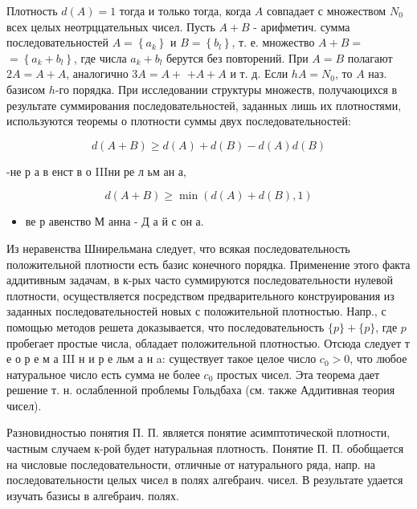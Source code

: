 \documentclass[10pt]{article}
\begin{document}
Плотность $d(A)=1$ тогда и только тогда, когда $A$ совпадает с множеством $N_{0}$ всех целых неотрццательных чисел. Пусть $A+B$ - арифметич. сумма последовательностей $A=\left\{a_{k}\right\}$ и $B=\left\{b_{l}\right\}$, т. е. множество $A+B=$ $=\left\{a_{k}+b_{l}\right\}$, где числа $a_{k}+b_{l}$ берутся без повторений. При $A=B$ полагают $2 A=A+A$, аналогично $3 A=A+$ $+A+A$ и т. д. Если $h A=N_{0}$, то $A$ наз. базисом $h$-го порядка. При исследовании структуры множеств, получаюцихся в результате суммирования последовательностей, заданных лишь их плотностями, используются теоремы о плотности суммы двух последовательностей:



\[

d(A+B) \geqslant d(A)+d(B)-d(A) d(B)

\]



-не р а в енст в о IIIни ре л ьм ан а,



\[

d(A+B) \geqslant \min (d(A)+d(B), 1)

\]



\begin{itemize}

  \item ве р авенство М анна - Д а й с он а.

\end{itemize}



Из неравенства Шнирельмана следует, что всякая последовательность положительной плотности есть базис конечного порядка. Применение этого факта аддитивным задачам, в к-рых часто суммируются последовательности нулевой плотности, осуществляется посредством предварительного конструирования из заданных последовательностей новых с положительной плотностью. Напр., с помощью методов решета доказывается, что последовательность $\{p\}+\{p\}$, где $p$ пробегает простые числа, обладает положительной плотностью. Отсюда следует т е о р е м а III н и р е льм а н a: существует такое целое число $c_{0}>0$, что любое натуральное число есть сумма не более $c_{0}$ простых чисел. Эта теорема дает решение т. н. ослабленной проблемы Гольдбаха (см. также Аддитивная теория чисел).



Разновидностью понятия П. П. является понятие асимптотической плотности, частным случаем к-рой будет натуральная плотность. Понятие П. П. обобщается на числовые последовательности, отличные от натурального ряда, напр. на последовательности целых чисел в полях алгебраич. чисел. В результате удается изучать базисы в алгебраич. полях.
\end{document}
